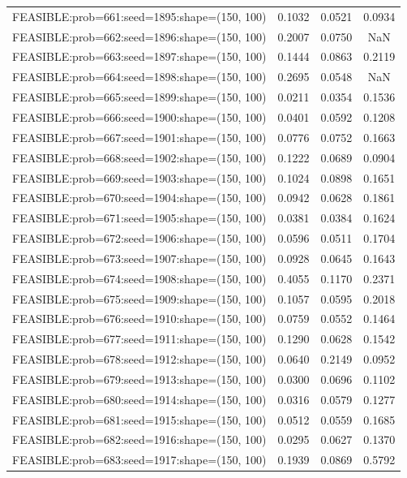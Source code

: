 \begin{longtable}{lccc}
FEASIBLE:prob=661:seed=1895:shape=(150, 100) & 0.1032 & 0.0521 & 0.0934 \\
FEASIBLE:prob=662:seed=1896:shape=(150, 100) & 0.2007 & 0.0750 &    NaN \\
FEASIBLE:prob=663:seed=1897:shape=(150, 100) & 0.1444 & 0.0863 & 0.2119 \\
FEASIBLE:prob=664:seed=1898:shape=(150, 100) & 0.2695 & 0.0548 &    NaN \\
FEASIBLE:prob=665:seed=1899:shape=(150, 100) & 0.0211 & 0.0354 & 0.1536 \\
FEASIBLE:prob=666:seed=1900:shape=(150, 100) & 0.0401 & 0.0592 & 0.1208 \\
FEASIBLE:prob=667:seed=1901:shape=(150, 100) & 0.0776 & 0.0752 & 0.1663 \\
FEASIBLE:prob=668:seed=1902:shape=(150, 100) & 0.1222 & 0.0689 & 0.0904 \\
FEASIBLE:prob=669:seed=1903:shape=(150, 100) & 0.1024 & 0.0898 & 0.1651 \\
FEASIBLE:prob=670:seed=1904:shape=(150, 100) & 0.0942 & 0.0628 & 0.1861 \\
FEASIBLE:prob=671:seed=1905:shape=(150, 100) & 0.0381 & 0.0384 & 0.1624 \\
FEASIBLE:prob=672:seed=1906:shape=(150, 100) & 0.0596 & 0.0511 & 0.1704 \\
FEASIBLE:prob=673:seed=1907:shape=(150, 100) & 0.0928 & 0.0645 & 0.1643 \\
FEASIBLE:prob=674:seed=1908:shape=(150, 100) & 0.4055 & 0.1170 & 0.2371 \\
FEASIBLE:prob=675:seed=1909:shape=(150, 100) & 0.1057 & 0.0595 & 0.2018 \\
FEASIBLE:prob=676:seed=1910:shape=(150, 100) & 0.0759 & 0.0552 & 0.1464 \\
FEASIBLE:prob=677:seed=1911:shape=(150, 100) & 0.1290 & 0.0628 & 0.1542 \\
FEASIBLE:prob=678:seed=1912:shape=(150, 100) & 0.0640 & 0.2149 & 0.0952 \\
FEASIBLE:prob=679:seed=1913:shape=(150, 100) & 0.0300 & 0.0696 & 0.1102 \\
FEASIBLE:prob=680:seed=1914:shape=(150, 100) & 0.0316 & 0.0579 & 0.1277 \\
FEASIBLE:prob=681:seed=1915:shape=(150, 100) & 0.0512 & 0.0559 & 0.1685 \\
FEASIBLE:prob=682:seed=1916:shape=(150, 100) & 0.0295 & 0.0627 & 0.1370 \\
FEASIBLE:prob=683:seed=1917:shape=(150, 100) & 0.1939 & 0.0869 & 0.5792 \\

\end{longtable}
